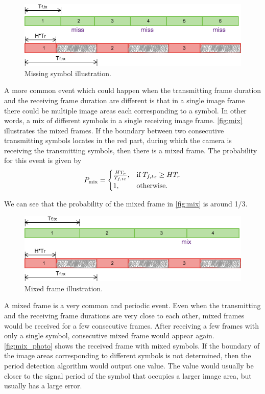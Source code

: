 \begin{figure}[!htb]
  \centering
  \includegraphics[scale=0.35]{fig/miss.png}
  \caption{Missing symbol illustration.}
  \label{fig:miss}
\end{figure}

A more common event which could happen when the transmitting frame duration and the receiving frame duration are different is that in a single image frame there could be multiple image areas each corresponding to a symbol. In other words, a mix of different symbols in a single receiving image frame. 
\autoref{fig:mix} illustrates the mixed frames. If the boundary between two consecutive transmitting symbols locates in the red part, during which the camera is receiving the transmitting symbols, then there is a mixed frame.
The probability for this event is given by
\begin{equation}
P_{\operatorname{mix}}=\begin{cases} \frac{H T_r}{T_{f,tx}}, & \textrm{if\;} T_{f,tx} \geq H T_r \\
1, & \textrm{otherwise.} \end{cases}
\end{equation}

We can see that the probability of the mixed frame in \autoref{fig:mix} is around 1/3.

\begin{figure}[!htb]
  \centering
  \includegraphics[scale=0.35]{fig/mix.png}
  \caption{Mixed frame illustration.}
  \label{fig:mix}
\end{figure}

A mixed frame is a very common and periodic event. Even when the transmitting and the receiving frame durations are very close to each other, mixed frames would be received for a few consecutive frames. After receiving a few frames with only a single symbol, consecutive mixed frame would appear again. \autoref{fig:mix_photo} shows the received frame with mixed symbols.
If the boundary of the image areas corresponding to different symbols is not determined, then the period detection algorithm would output one value. The value would usually be closer to the signal period of the symbol that occupies a larger image area, but usually has a large error. 

